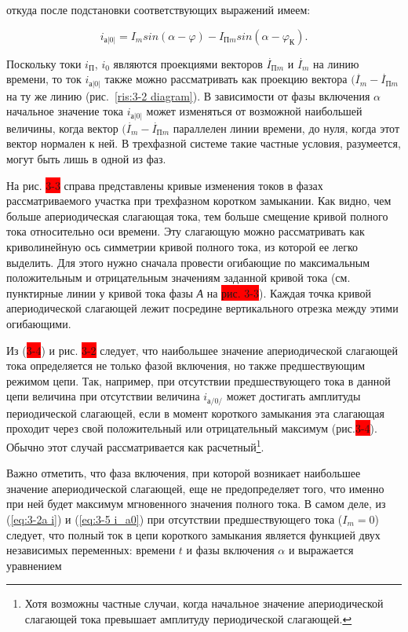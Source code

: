 откуда после подстановки соответствующих выражений имеем:

\begin{equation}
	i_{\text{а}|0|} = I_m sin(\alpha - \varphi) - I_{\text{П}m} sin(\alpha - \varphi_{\text{К}}).
	\label{eq:3-5 i_a0}
\end{equation}

Поскольку токи $ i_{\text{П}} $, $ i_0 $ являются проекциями векторов $ \overset{\;.}{I}_{\text{П}m} $ и $ \overset{\;.}{I}_m $ на линию времени, то ток $ 	i_{\text{а}|0|} $ также можно рассматривать как проекцию вектора $ (\overset{\;.}{I}_m - \overset{\;.}{I}_{\text{П}m} $ на ту же линию (рис.~\ref{ris:3-2 diagram}). В зависимости от фазы включения $ \alpha $ начальное значение тока $ 	i_{\text{а}|0|} $ может изменяться от возможной наибольшей величины, когда вектор $ (\overset{\;.}{I}_m - \overset{\;.}{I}_{\text{П}m} $ параллелен линии времени, до нуля, когда этот вектор нормален к ней. В трехфазной системе такие частные условия, разумеется, могут быть лишь в одной из фаз.


На рис. \colorbox{red}{3-3} справа представлены кривые изменения токов в фазах рассматриваемого участка при трехфазном коротком замыкании. Как видно, чем больше апериодическая слагающая тока, тем больше смещение кривой полного тока относительно оси времени. Эту слагающую можно рассматривать как криволинейную ось симметрии кривой полного тока, из которой ее легко выделить. Для этого нужно сначала провести огибающие по максимальным положительным и отрицательным значениям заданной кривой тока (см. пунктирные линии у кривой тока фазы \textit{А} на \colorbox{red}{рис. 3-3}). Каждая точка кривой апериодической слагающей лежит посредине вертикального отрезка между этими огибающими.

Из (\colorbox{red}{3-4}) и рис. \colorbox{red}{3-2} следует, что наибольшее значение апериодической слагающей тока определяется не только фазой включения, но также предшествующим режимом цепи. Так, например, при отсутствии предшествующего тока в данной цепи величина 
при отсутствии величина $ i_{\text{а}/0/} $ может достигать амплитуды периодической слагающей, если в момент короткого замыкания эта слагающая проходит через свой положительный или отрицательный максимум (рис.\colorbox{red}{3-4}). Обычно этот случай рассматривается как расчетный\footnote{Хотя возможны частные случаи, когда начальное значение апериодической слагающей тока превышает амплитуду периодической слагающей.}.

Важно отметить, что фаза включения, при которой возникает наибольшее значение апериодической слагающей, еще не предопределяет того, что именно при ней будет максимум мгновенного значения полного тока. В самом деле, из (\ref{eq:3-2a i}) и (\ref{eq:3-5 i_a0}) при отсутствии предшествующего тока ($ I_m = 0 $) следует, что полный ток в цепи короткого замыкания является функцией двух независимых переменных: времени $ t $ и фазы включения $ \alpha $ и выражается уравнением








